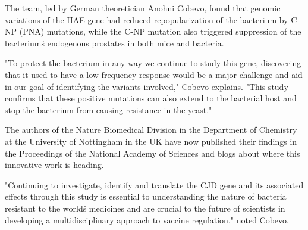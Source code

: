 \documentclass{article}
\begin{document}
The team, led by German theoretician Anohni Cobevo, found that genomic variations of the HAE gene had reduced repopularization of the bacterium by C-NP (PNA) mutations, while the C-NP mutation also triggered suppression of the bacterium\'s endogenous prostates in both mice and bacteria.

"To protect the bacterium in any way we continue to study this gene, discovering that it used to have a low frequency response would be a major challenge and aid in our goal of identifying the variants involved," Cobevo explains. "This study confirms that these positive mutations can also extend to the bacterial host and stop the bacterium from causing resistance in the yeast."

The authors of the Nature Biomedical Division in the Department of Chemistry at the University of Nottingham in the UK have now published their findings in the Proceedings of the National Academy of Sciences and blogs about where this innovative work is heading.

"Continuing to investigate, identify and translate the CJD gene and its associated effects through this study is essential to understanding the nature of bacteria resistant to the world\'s medicines and are crucial to the future of scientists in developing a multidisciplinary approach to vaccine regulation," noted Cobevo.
\end{document}
